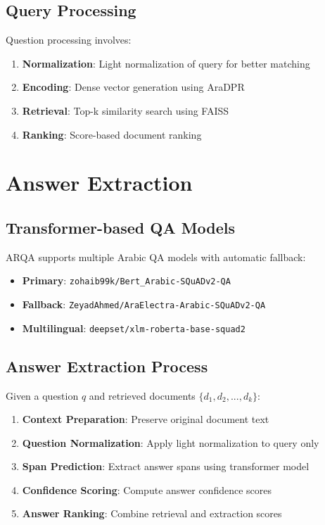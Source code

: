 \documentclass[conference]{IEEEtran}
\begin{document}
\subsection{Query Processing}
Question processing involves:
\begin{enumerate}
    \item \textbf{Normalization}: Light normalization of query for better matching
    \item \textbf{Encoding}: Dense vector generation using AraDPR
    \item \textbf{Retrieval}: Top-k similarity search using FAISS
    \item \textbf{Ranking}: Score-based document ranking
\end{enumerate}

\section{Answer Extraction}

\subsection{Transformer-based QA Models}
ARQA supports multiple Arabic QA models with automatic fallback:
\begin{itemize}
    \item \textbf{Primary}: \texttt{zohaib99k/Bert\_Arabic-SQuADv2-QA}
    \item \textbf{Fallback}: \texttt{ZeyadAhmed/AraElectra-Arabic-SQuADv2-QA}
    \item \textbf{Multilingual}: \texttt{deepset/xlm-roberta-base-squad2}
\end{itemize}

\subsection{Answer Extraction Process}
Given a question $q$ and retrieved documents $\{d_1, d_2, ..., d_k\}$:

\begin{enumerate}
    \item \textbf{Context Preparation}: Preserve original document text
    \item \textbf{Question Normalization}: Apply light normalization to query only
    \item \textbf{Span Prediction}: Extract answer spans using transformer model
    \item \textbf{Confidence Scoring}: Compute answer confidence scores
    \item \textbf{Answer Ranking}: Combine retrieval and extraction scores
\end{enumerate}
\end{document}
